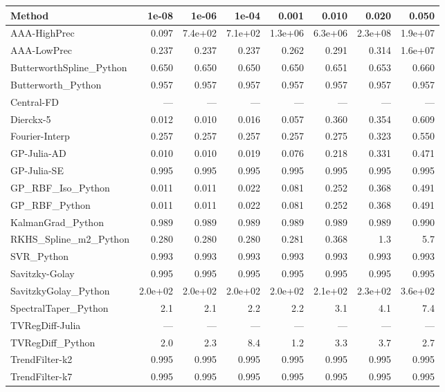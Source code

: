 \begin{longtable}{lrrrrrrr}
\toprule
\textbf{Method} & \textbf{1e-08} & \textbf{1e-06} & \textbf{1e-04} & \textbf{0.001} & \textbf{0.010} & \textbf{0.020} & \textbf{0.050} \\
\midrule
\endhead
AAA-HighPrec & 0.097 & 7.4e+02 & 7.1e+02 & 1.3e+06 & 6.3e+06 & 2.3e+08 & 1.9e+07 \\
AAA-LowPrec & 0.237 & 0.237 & 0.237 & 0.262 & 0.291 & 0.314 & 1.6e+07 \\
ButterworthSpline\_Python & 0.650 & 0.650 & 0.650 & 0.650 & 0.651 & 0.653 & 0.660 \\
Butterworth\_Python & 0.957 & 0.957 & 0.957 & 0.957 & 0.957 & 0.957 & 0.957 \\
Central-FD & --- & --- & --- & --- & --- & --- & --- \\
Dierckx-5 & 0.012 & 0.010 & 0.016 & 0.057 & 0.360 & 0.354 & 0.609 \\
Fourier-Interp & 0.257 & 0.257 & 0.257 & 0.257 & 0.275 & 0.323 & 0.550 \\
GP-Julia-AD & 0.010 & 0.010 & 0.019 & 0.076 & 0.218 & 0.331 & 0.471 \\
GP-Julia-SE & 0.995 & 0.995 & 0.995 & 0.995 & 0.995 & 0.995 & 0.995 \\
GP\_RBF\_Iso\_Python & 0.011 & 0.011 & 0.022 & 0.081 & 0.252 & 0.368 & 0.491 \\
GP\_RBF\_Python & 0.011 & 0.011 & 0.022 & 0.081 & 0.252 & 0.368 & 0.491 \\
KalmanGrad\_Python & 0.989 & 0.989 & 0.989 & 0.989 & 0.989 & 0.989 & 0.990 \\
RKHS\_Spline\_m2\_Python & 0.280 & 0.280 & 0.280 & 0.281 & 0.368 & 1.3 & 5.7 \\
SVR\_Python & 0.993 & 0.993 & 0.993 & 0.993 & 0.993 & 0.993 & 0.993 \\
Savitzky-Golay & 0.995 & 0.995 & 0.995 & 0.995 & 0.995 & 0.995 & 0.995 \\
SavitzkyGolay\_Python & 2.0e+02 & 2.0e+02 & 2.0e+02 & 2.0e+02 & 2.1e+02 & 2.3e+02 & 3.6e+02 \\
SpectralTaper\_Python & 2.1 & 2.1 & 2.2 & 2.2 & 3.1 & 4.1 & 7.4 \\
TVRegDiff-Julia & --- & --- & --- & --- & --- & --- & --- \\
TVRegDiff\_Python & 2.0 & 2.3 & 8.4 & 1.2 & 3.3 & 3.7 & 2.7 \\
TrendFilter-k2 & 0.995 & 0.995 & 0.995 & 0.995 & 0.995 & 0.995 & 0.995 \\
TrendFilter-k7 & 0.995 & 0.995 & 0.995 & 0.995 & 0.995 & 0.995 & 0.995 \\

\end{longtable}
